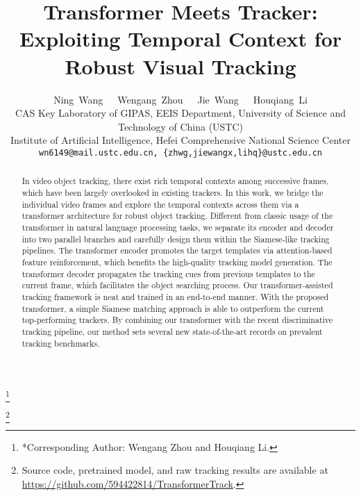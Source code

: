 \documentclass[10pt,twocolumn,letterpaper]{article}
\begin{document}
\title{Transformer Meets Tracker: \\ Exploiting Temporal Context for Robust Visual Tracking}


\author{Ning~Wang~~~Wengang~Zhou~~~Jie~Wang~~~Houqiang~Li\\
	{\normalsize CAS Key Laboratory of GIPAS, EEIS Department, University of Science and Technology of China (USTC)} \\
    {\normalsize Institute of Artificial Intelligence, Hefei Comprehensive National Science Center} \\
	{\tt\small wn6149@mail.ustc.edu.cn, \{zhwg,jiewangx,lihq\}@ustc.edu.cn}
}

\maketitle



\newcommand\blfootnote[1]{\begingroup 
\renewcommand\thefootnote{}\footnote{#1}\addtocounter{footnote}{-1}\endgroup 
}


\begin{abstract}
	In video object tracking, there exist rich temporal contexts among successive frames, which have been largely overlooked in existing trackers.
In this work, we bridge the individual video frames and explore the temporal contexts across them via a transformer architecture for robust object tracking.
Different from classic usage of the transformer in natural language processing tasks, we separate its encoder and decoder into two parallel branches and carefully design them within the Siamese-like tracking pipelines.
The transformer encoder promotes the target templates via attention-based feature reinforcement, which benefits the high-quality tracking model generation.
The transformer decoder propagates the tracking cues from previous templates to the current frame, which facilitates the object searching process.
Our transformer-assisted tracking framework is neat and trained in an end-to-end manner.
With the proposed transformer, a simple Siamese matching approach is able to outperform the current top-performing trackers.
By combining our transformer with the recent discriminative tracking pipeline, our method sets several new state-of-the-art records on prevalent tracking benchmarks. 
\end{abstract}






\blfootnote{*Corresponding Author: Wengang Zhou and Houqiang Li.} 
\blfootnote{\dag Source code, pretrained model, and raw tracking results are available at \url{https://github.com/594422814/TransformerTrack}. } 
\end{document}
